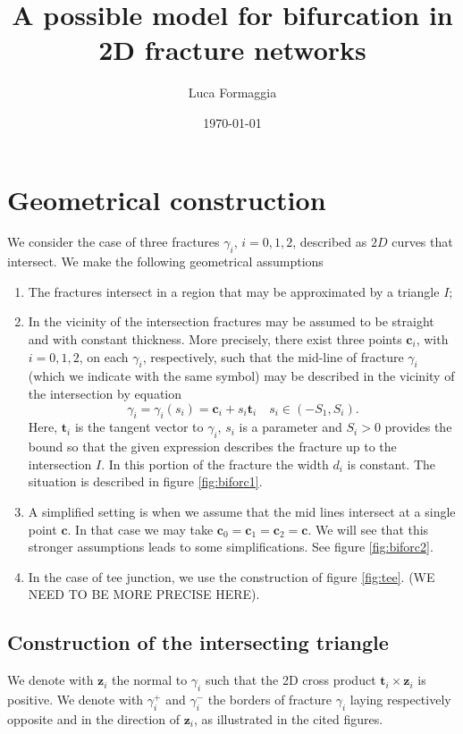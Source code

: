 \documentclass[11pt,a4paper,twoside]{article}
\author{Luca Formaggia}
\date{\today}
\title{A possible model for bifurcation in 2D fracture networks}
\newcommand{\fracture}{\ensuremath{\gamma}}
\newcommand{\centerpoint}{\ensuremath{\boldsymbol{c}}}
\newcommand{\fracturetangent}{\ensuremath{\boldsymbol{t}}}
\newcommand{\fracturenormal}{\ensuremath{\boldsymbol{z}}}
\begin{document}
\maketitle
\section{Geometrical construction}
We consider the case of three fractures $\gamma_i$, $i=0,1,2$, described as $2D$ curves that intersect. We make the following geometrical assumptions

\begin{enumerate}
\item The fractures intersect in a region that may be approximated by a triangle $I$;
\item In the vicinity of the intersection fractures may be assumed to
  be straight and with constant thickness. More precisely, there exist
  three points $\centerpoint_i$, with $i=0,1,2$, on each
  $\fracture_i$, respectively, such that the mid-line of fracture
  $\fracture_i$ (which we indicate with the same symbol) may be
  described in the vicinity of the intersection by equation
\begin{equation}
\label{eq:fracture}
\fracture_i=\fracture_i(s_i)=\centerpoint_i+s_i\fracturetangent_i \quad s_i\in (-S_1,S_i).
\end{equation}
Here, $\fracturetangent_i$ is the tangent vector to $\fracture_i$, $s_i$ is a
parameter and $S_i>0$ provides the bound so that the given expression
describes the fracture up to the intersection $I$.  In this portion of
the fracture the width $d_i$ is constant.  The situation is described
in figure \ref{fig:biforc1}.
\item \label{it:simple} A simplified setting is when we assume that
  the mid lines intersect at a single point $\centerpoint$. In that
  case we may take
  $\centerpoint_0=\centerpoint_1=\centerpoint_2=\centerpoint$. We will
  see that this stronger assumptions leads to some simplifications.
  See figure \ref{fig:biforc2}.
\item In the case of tee junction, we use the construction of figure
  \ref{fig:tee}. (WE NEED TO BE MORE PRECISE HERE).
\end{enumerate}

\subsection{Construction of the intersecting triangle}
We denote with $\fracturenormal_i$ the normal to $\fracture_i$ such
that the 2D cross product $\fracturetangent_i\times\fracturenormal_i$
is positive. We denote with $\fracture_i^{+}$ and $\fracture_i^{-}$
the borders of fracture $\fracture_i$ laying respectively opposite and
in the direction of $\fracturenormal_i$, as illustrated in the cited
figures.
\end{document}
